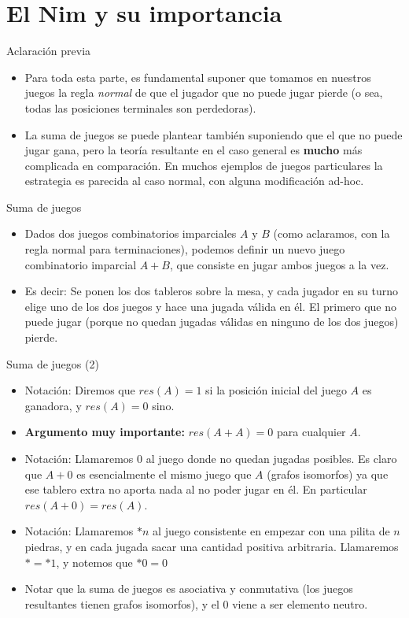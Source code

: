 \documentclass{beamer}
\begin{document}
\section{El Nim y su importancia}

\begin{frame}{Aclaración previa}
    \begin{itemize}
        \item Para toda esta parte, es fundamental suponer que tomamos en nuestros juegos la regla \textit{normal} de que el jugador que no puede jugar pierde
        (o sea, todas las posiciones terminales son perdedoras).
        \item La suma de juegos se puede plantear también suponiendo que el que no puede jugar gana, pero la teoría resultante en el caso general es
         \textbf{mucho} más complicada en comparación. En muchos ejemplos de juegos particulares la estrategia es parecida al caso normal,
         con alguna modificación ad-hoc.
    \end{itemize}
\end{frame}

\begin{frame}{Suma de juegos}
    \begin{itemize}
        \item Dados dos juegos combinatorios imparciales $A$ y $B$ (como aclaramos, con la regla normal para terminaciones), podemos
        definir un nuevo juego combinatorio imparcial $A+B$, que consiste en jugar ambos juegos a la vez.
        \item Es decir: Se ponen los dos tableros sobre la mesa, y cada jugador en su turno elige uno de los dos juegos y hace una
        jugada válida en él. El primero que no puede jugar (porque no quedan jugadas válidas en ninguno de los dos juegos) pierde.
    \end{itemize}
\end{frame}

\begin{frame}{Suma de juegos (2)}
    \begin{itemize}
        \item Notación: Diremos que $res(A) = 1$ si la posición inicial del juego $A$ es ganadora, y $res(A) = 0$ sino.
        \item \textbf{Argumento muy importante:} $res(A+A) = 0$ para cualquier $A$.
        \item Notación: Llamaremos $0$ al juego donde no quedan jugadas posibles. Es claro que $A+0$ es esencialmente el mismo
        juego que $A$ (grafos isomorfos) ya que ese tablero extra no aporta nada al no poder jugar en él. En particular $res(A+0) = res(A)$.
        \item Notación: Llamaremos $*n$ al juego consistente en empezar con una pilita de $n$ piedras, y en cada jugada sacar una cantidad positiva arbitraria. Llamaremos $* = *1$, y notemos que $*0 = 0$
        \item Notar que la suma de juegos es asociativa y conmutativa (los juegos resultantes tienen grafos isomorfos), y el $0$ viene a ser elemento neutro.
    \end{itemize}
\end{frame}
\end{document}
